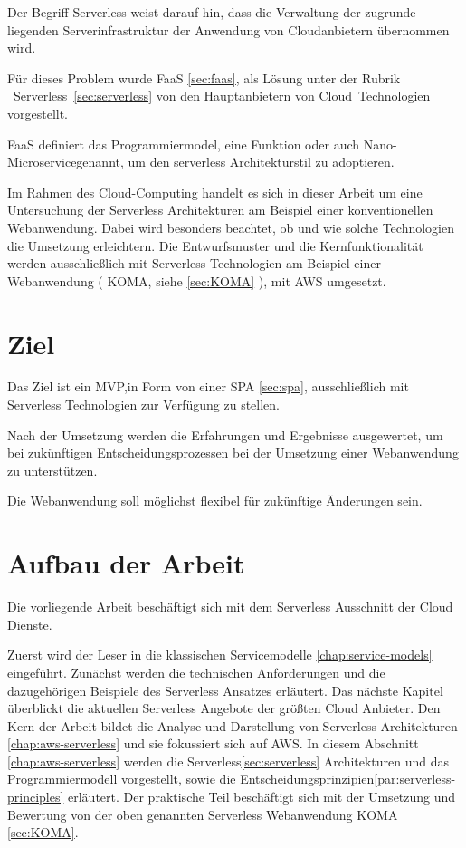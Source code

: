 \documentclass[
12pt,
english,
ngerman,
headsepline,
twoside,
openright,
numbers=noenddot,version=first
]{scrreprt}
\begin{document}
Der Begriff Serverless weist darauf hin, dass die Verwaltung der zugrunde liegenden Serverinfrastruktur der Anwendung von Cloudanbietern übernommen wird. 

Für dieses Problem wurde \acrfull{FaaS} \ref{sec:faas}, als Lösung unter der Rubrik \glqq\ Serverless\grqq\ \ref{sec:serverless} von den Hauptanbietern von \glqq Cloud\grqq\ Technologien vorgestellt.

\acrshort{FaaS} definiert das Programmiermodel, eine Funktion oder auch \glqq Nano-Microservice\grqq genannt, um den serverless Architekturstil zu adoptieren.

Im Rahmen des Cloud-Computing handelt es sich in dieser Arbeit um eine Untersuchung der Serverless Architekturen am Beispiel einer konventionellen Webanwendung. Dabei wird besonders beachtet, ob und wie solche Technologien die Umsetzung erleichtern. Die Entwurfsmuster und die Kernfunktionalität werden ausschließlich mit Serverless Technologien am Beispiel einer Webanwendung ( \acrfull{KOMA}, siehe \autoref{sec:KOMA} ), mit \acrshort{AWS} umgesetzt.


\section{Ziel}
\label{sec:task}
Das Ziel ist ein \acrfull{MVP},in Form von einer \acrfull{SPA} \ref{sec:spa}, ausschließlich mit Serverless Technologien zur Verfügung zu stellen.

Nach der Umsetzung werden die Erfahrungen und Ergebnisse ausgewertet, um bei zukünftigen Entscheidungsprozessen bei der Umsetzung einer Webanwendung zu unterstützen.

Die Webanwendung soll möglichst flexibel für zukünftige Änderungen sein.

\section{Aufbau der Arbeit}
\label{sec:layout}

Die vorliegende Arbeit beschäftigt sich mit dem Serverless Ausschnitt der Cloud Dienste. 

Zuerst wird der Leser in die klassischen Servicemodelle \ref{chap:service-models} eingeführt. Zunächst werden die technischen Anforderungen und die dazugehörigen Beispiele des Serverless Ansatzes erläutert.
Das nächste Kapitel überblickt die aktuellen Serverless Angebote der größten Cloud Anbieter.
Den Kern der Arbeit bildet die Analyse und Darstellung von Serverless Architekturen \ref{chap:aws-serverless} und sie fokussiert sich auf \acrfull{AWS}. In diesem Abschnitt \ref{chap:aws-serverless} werden die Serverless\ref{sec:serverless} Architekturen und das Programmiermodell vorgestellt, sowie die Entscheidungsprinzipien\ref{par:serverless-principles} erläutert.
Der praktische Teil beschäftigt sich mit der Umsetzung und Bewertung von der oben genannten Serverless Webanwendung KOMA \ref{sec:KOMA}.
\end{document}
